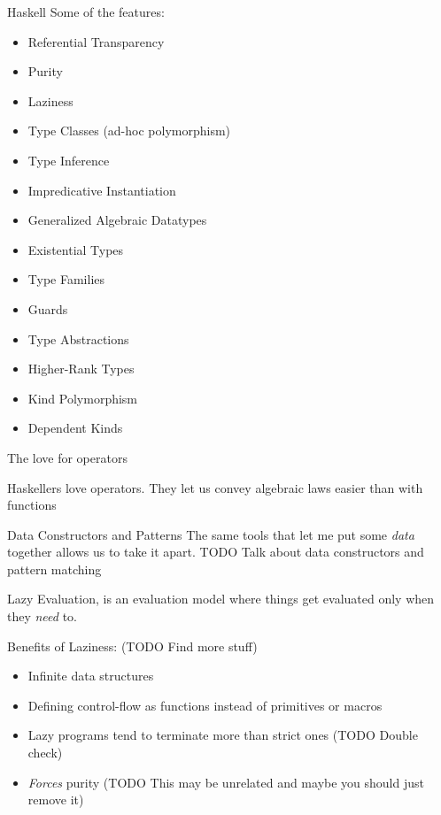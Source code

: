 \documentclass[pdf]{beamer}
\begin{document}
\begin{frame}{Haskell}
  Some of the features:
  \begin{itemize}
  \item Referential Transparency
  \item Purity
  \item Laziness
  \item Type Classes (ad-hoc polymorphism)
  \item Type Inference
  \item Impredicative Instantiation
  \item Generalized Algebraic Datatypes
  \item Existential Types
  \item Type Families
  \item Guards
  \item Type Abstractions
  \item Higher-Rank Types
  \item Kind Polymorphism
  \item Dependent Kinds
  \end{itemize}

\end{frame}

\begin{frame}{The love for operators}

  Haskellers love operators. They let us convey algebraic laws easier than with functions

\end{frame}

\begin{frame}{Data Constructors and Patterns}
  The same tools that let me put some \textit{data} together allows us to take it apart.
  TODO Talk about data constructors and pattern matching
\end{frame}

\begin{frame}
  Lazy Evaluation, is an evaluation model where things get evaluated only when they \textit{need} to.

  Benefits of Laziness: (TODO Find more stuff)
  \begin{itemize}
  \item Infinite data structures
  \item Defining control-flow as functions instead of primitives or macros
  \item Lazy programs tend to terminate more than strict ones (TODO Double check)
  \item \textit{Forces} purity (TODO This may be unrelated and maybe you should just remove it)
  \end{itemize}
\end{frame}
\end{document}
